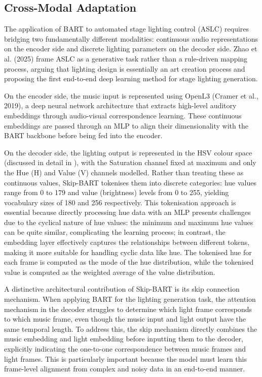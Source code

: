 \subsection{Cross-Modal Adaptation}

The application of BART to automated stage lighting control (ASLC) requires bridging two fundamentally different modalities: continuous audio representations on the encoder side and discrete lighting parameters on the decoder side. Zhao et al. (2025) frame ASLC as a generative task rather than a rule-driven mapping process, arguing that lighting design is essentially an art creation process and proposing the first end-to-end deep learning method for stage lighting generation.\cite{zhao2025automatic}\cite{zhao2025automatic} 

On the encoder side, the music input is represented using OpenL3 (Cramer et al., 2019), a deep neural network architecture that extracts high-level auditory embeddings through audio-visual correspondence learning.\cite{zhao2025automatic}  These continuous embeddings are passed through an MLP to align their dimensionality with the BART backbone before being fed into the encoder.\cite{zhao2025automatic} 

On the decoder side, the lighting output is represented in the HSV colour space (discussed in detail in ), with the Saturation channel fixed at maximum and only the Hue (H) and Value (V) channels modelled. Rather than treating these as continuous values, Skip-BART tokenises them into discrete categories: hue values range from 0 to 179 and value (brightness) levels from 0 to 255, yielding vocabulary sizes of 180 and 256 respectively.\cite{zhao2025automatic}  This tokenisation approach is essential because directly processing hue data with an MLP presents challenges due to the cyclical nature of hue values: the minimum and maximum hue values can be quite similar, complicating the learning process; in contrast, the embedding layer effectively captures the relationships between different tokens, making it more suitable for handling cyclic data like hue.\cite{zhao2025automatic}  The tokenised hue for each frame is computed as the mode of the hue distribution, while the tokenised value is computed as the weighted average of the value distribution.\cite{zhao2025automatic} 

A distinctive architectural contribution of Skip-BART is its skip connection mechanism. When applying BART for the lighting generation task, the attention mechanism in the decoder struggles to determine which light frame corresponds to which music frame, even though the music input and light output have the same temporal length. To address this, the skip mechanism directly combines the music embedding and light embedding before inputting them to the decoder, explicitly indicating the one-to-one correspondence between music frames and light frames. This is particularly important because the model must learn this frame-level alignment from complex and noisy data in an end-to-end manner.\cite{zhao2025automatic} 

